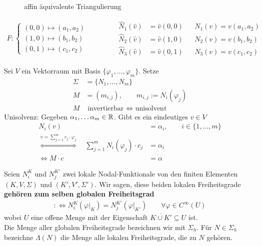 \begin{beisp}\

\begin{figure}[!ht]
\begin{center}

\caption{affin äquivalente Triangulierung}
\label{AbbAffinEquivTriang}
\end{center}
\end{figure}

\begin{align*}
F:\left\lbrace\begin{array}{l}
(0,0)\mapsto(a_1,a_2)\\
(1,0)\mapsto(b_1,b_2)\\
(0,1)\mapsto(c_1,c_2)
\end{array}\right.
\qquad\qquad
\begin{matrix}
\hat{N}_1(\hat{v})&=\hat{v}(0,0) &&N_1(v)=v(a_1,a_2)\\
\hat{N}_2(\hat{v})&=\hat{v}(1,0) &&N_2(v)=v(b_1,b_2)\\
\hat{N}_3(\hat{v})&=\hat{v}(0,1) &&N_3(v)=v(c_1,c_2)
\end{matrix}
\end{align*}
\end{beisp}

Sei $V$ ein Vektorraum mit Basis $\lbrace\varphi_1,\ldots,\varphi_m\rbrace$. Setze
\begin{align*}
\Sigma&=\lbrace N_1,\ldots,N_m\rbrace\\
M&=(m_{i,j}),\qquad m_{i,j}:=N_i(\varphi_j)\\
M&\text{ invertierbar }\Longleftrightarrow \text{ unisolvent}
\end{align*}
Unisolvenz: Gegeben $\alpha_1,\ldots\alpha_m\in\mathbb{R}$. Gibt es ein eindeutiges $v\in V$
\begin{align*}
N_i(v)&=\alpha_i,\qquad i\in\lbrace1,\ldots,m\rbrace\\
\stackrel{v=\sum\limits_{j=1}^m c_j\cdot\varphi_j}{\Longleftrightarrow}\quad
\sum\limits_{j=1}^m N_i(\varphi_j)\cdot c_j&=\alpha_i\\
\Longleftrightarrow
M\cdot c&=\alpha
\end{align*}

\begin{definition}\enter
Seien $N_i^K$ und $N_j^{K'}$ zwei lokale Nodal-Funktionale von den finiten Elementen $(K,V,\Sigma)$ und $(K',V',\Sigma')$. Wir sagen, diese beiden lokalen Freiheitsgrade \textbf{gehören zum selben globalen Freiheitsgrad}
\begin{align*}
:\Longleftrightarrow N_i^K(\varphi|_K)=N_j^{K'}(\varphi|_{K'})\qquad\forall\varphi\in C^\infty(U)
\end{align*}
wobei $U$ eine offene Menge mit der Eigenschaft $\overline{K\cup K'}\subseteq U$ ist.\\
Die Menge aller globalen Freiheitsgrade bezeichnen wir mit $\Sigma_h$. Für $N\in\Sigma_h$ bezeichne $\Lambda(N)$ die Menge alle lokalen Freiheitsgrade, die zu $N$ gehören.
\end{definition}

